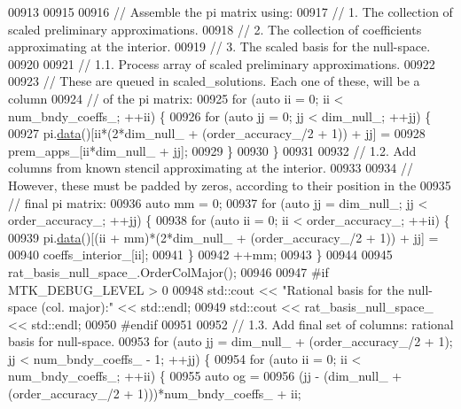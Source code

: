\begin{DoxyCode}
{{00913 
00915 
00916   \textcolor{comment}{// Assemble the pi matrix using:}
00917   \textcolor{comment}{// 1. The collection of scaled preliminary approximations.}
00918   \textcolor{comment}{// 2. The collection of coefficients approximating at the interior.}
00919   \textcolor{comment}{// 3. The scaled basis for the null-space.}
00920 
00921   \textcolor{comment}{// 1.1. Process array of scaled preliminary approximations.}
00922 
00923   \textcolor{comment}{// These are queued in scaled\_solutions. Each one of these, will be a column}
00924   \textcolor{comment}{// of the pi matrix:}
00925   \textcolor{keywordflow}{for} (\textcolor{keyword}{auto} ii = 0; ii < num\_bndy\_coeffs\_; ++ii) \{
00926     \textcolor{keywordflow}{for} (\textcolor{keyword}{auto} jj = 0; jj < dim\_null\_; ++jj) \{
00927       pi.\hyperlink{classmtk_1_1DenseMatrix_a0c33b8a9e01d157c61ddbdf807c25d84}{data}()[ii*(2*dim\_null\_ + (order\_accuracy\_/2 + 1)) + jj] =
00928         prem\_apps\_[ii*dim\_null\_ + jj];
00929     \}
00930   \}
00931 
00932   \textcolor{comment}{// 1.2. Add columns from known stencil approximating at the interior.}
00933 
00934   \textcolor{comment}{// However, these must be padded by zeros, according to their position in the}
00935   \textcolor{comment}{// final pi matrix:}
00936   \textcolor{keyword}{auto} mm = 0;
00937   \textcolor{keywordflow}{for} (\textcolor{keyword}{auto} jj = dim\_null\_; jj < order\_accuracy\_; ++jj) \{
00938     \textcolor{keywordflow}{for} (\textcolor{keyword}{auto} ii = 0; ii < order\_accuracy\_; ++ii) \{
00939       pi.\hyperlink{classmtk_1_1DenseMatrix_a0c33b8a9e01d157c61ddbdf807c25d84}{data}()[(ii + mm)*(2*dim\_null\_ + (order\_accuracy\_/2 + 1)) + jj] =
00940         coeffs\_interior\_[ii];
00941     \}
00942     ++mm;
00943   \}
00944 
00945   rat\_basis\_null\_space\_.OrderColMajor();
00946 
00947 \textcolor{preprocessor}{  #if MTK\_DEBUG\_LEVEL > 0}
00948   std::cout << \textcolor{stringliteral}{"Rational basis for the null-space (col. major):"} << std::endl;
00949   std::cout << rat\_basis\_null\_space\_ << std::endl;
00950 \textcolor{preprocessor}{  #endif}
00951 
00952   \textcolor{comment}{// 1.3. Add final set of columns: rational basis for null-space.}
00953   \textcolor{keywordflow}{for} (\textcolor{keyword}{auto} jj = dim\_null\_ + (order\_accuracy\_/2 + 1); jj < num\_bndy\_coeffs\_ - 1; ++jj) \{
00954     \textcolor{keywordflow}{for} (\textcolor{keyword}{auto} ii = 0; ii < num\_bndy\_coeffs\_; ++ii) \{
00955       \textcolor{keyword}{auto} og =
00956         (jj - (dim\_null\_ + (order\_accuracy\_/2 + 1)))*num\_bndy\_coeffs\_ + ii;
}}
\end{DoxyCode}
